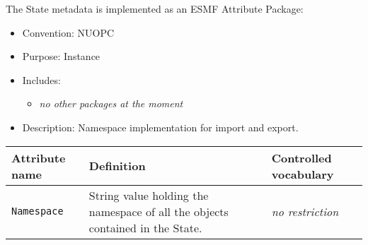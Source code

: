 \label{StateMeta}
The State metadata is implemented as an ESMF Attribute Package:

\begin{itemize}
    \item Convention: NUOPC
    \item Purpose: Instance
    \item Includes:
    \begin{itemize}
        \item {\em no other packages at the moment}
    \end{itemize} 
    \item Description: Namespace implementation for import and export. 
\end{itemize}

\begin{tabular}{|p{5cm}|p{5cm}|p{35mm}|}
     \hline\hline
     {\bf Attribute name} & {\bf Definition} & {\bf Controlled vocabulary}\\
     \hline\hline
     {\tt Namespace} & String value holding the namespace of all the objects contained in the State.& {\em no restriction}\\ \hline
     \hline
\end{tabular}
